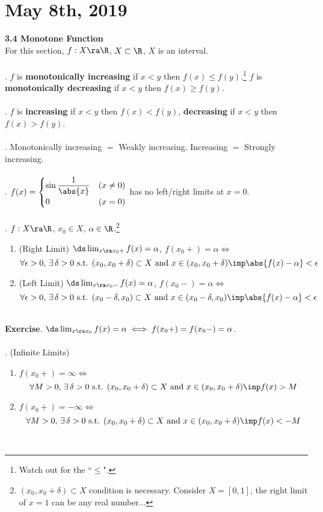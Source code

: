 \section*{May 8th, 2019}
\textbf{3.4 Monotone Function}\\
For this section, $f:X\ra\R$, $X\subset \R$, $X$ is an interval.\\
\\
. $f$ is \textbf{monotonically increasing} if $x<y$ then $ f(x)\leq f(y)$.\footnote{Watch out for the ``$\leq$".} $f$ is \textbf{monotonically decreasing} if $x<y$ then $f(x)\geq f(y)$.\\
\\
. $f$ is \textbf{increasing} if $x < y$ then $f(x) < f(y)$, \textbf{decreasing} if $x<y$ then $f(x) > f(y)$.\\
\\
\rmk. Monotonically increasing $=$ Weakly increasing. Increasing $=$ Strongly increasing.\\
\\
\ex. $f(x) = \begin{cases}
	\sin \dfrac{1}{\abs{x}} & (x\neq 0)\\
	0 & (x = 0)
\end{cases}$ has no left/right limits at $x = 0$.\\
\\
. $f:X\ra \R$, $x_0\in X$, $\alpha \in \R$.\footnote{$(x_0, x_0+\delta) \subset X$ condition is necessary. Consider $X=[0, 1]$, the right limit of $x=1$ can be any real number...}
\begin{enumerate}
	\item (Right Limit) $\ds \lim_{x\ra x_0+} f(x)= \alpha$, $f(x_0+) = \alpha\iff$ $$\forall \epsilon > 0,\, \exists\,\delta>0 \text{ s.t. }(x_0, x_0 +\delta) \subset X \text{ and }x\in (x_0, x_0+\delta) \imp \abs{f(x)-\alpha} < \epsilon$$
	\item (Left Limit) $\ds \lim_{x\ra x_0-} f(x)= \alpha$, $f(x_0-) = \alpha\iff$ $$\forall \epsilon > 0,\, \exists\,\delta>0 \text{ s.t. }(x_0 - \delta, x_0 ) \subset X \text{ and }x\in (x_0 - \delta, x_0) \imp \abs{f(x)-\alpha} < \epsilon$$
\end{enumerate}~\\
\textbf{Exercise}. $\ds \lim_{x\ra x_0}f(x) = \alpha \iff f(x_0+) = f(x_0-) = \alpha$.\\
\\
. (Infinite Limits)
\begin{enumerate}
	\item $f(x_0+) = \infty \iff $ $$\forall M>0,\, \exists\,\delta>0 \text{ s.t. } (x_0, x_0+\delta) \subset X \text{ and } x\in (x_0, x_0 + \delta) \imp f(x) > M$$ 
	\item $f(x_0+) = -\infty \iff $ $$\forall M>0,\, \exists\,\delta>0 \text{ s.t. } (x_0, x_0+\delta) \subset X \text{ and } x\in (x_0, x_0 + \delta) \imp f(x) <-M$$	
\end{enumerate}~\\
